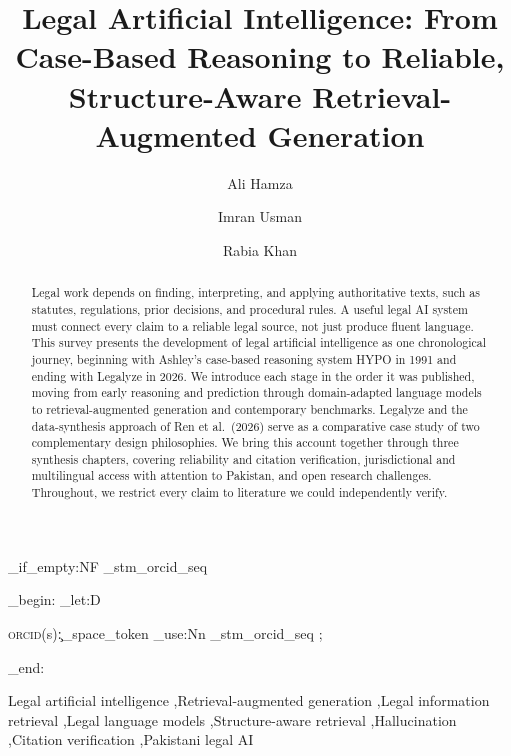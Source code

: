 \documentclass[final]{cas-dc}
\begin{document}
\ExplSyntaxOn
\RenewDocumentCommand \printorcid { }
{
  \seq_if_empty:NF \g_stm_orcid_seq
  {
    \group_begin:
      \tex_let:D \thefootnote \relax \footnotetext
      {
        \raggedright
        \textsc{orcid}(s):\c_space_token
        \seq_use:Nn \g_stm_orcid_seq { ;~ }
      }
    \group_end:
  }
}
\ExplSyntaxOff


\title[weight=\bfseries, size=\Huge]{Legal Artificial Intelligence: From Case-Based Reasoning to Reliable, Structure-Aware Retrieval-Augmented Generation}

\author{Ali Hamza}
\cormark[1]

\author{Imran Usman}

\author{Rabia Khan}



\begin{abstract}
Legal work depends on finding, interpreting, and applying authoritative texts, such as statutes,
regulations, prior decisions, and procedural rules. A useful legal AI system must connect every
claim to a reliable legal source, not just produce fluent language. This survey presents the
development of legal artificial intelligence as one chronological journey, beginning with Ashley's
case-based reasoning system HYPO in 1991 and ending with Legalyze in 2026. We introduce each stage
in the order it was published, moving from early reasoning and prediction through domain-adapted
language models to retrieval-augmented generation and contemporary benchmarks. Legalyze and the
data-synthesis approach of Ren et al.\ (2026) serve as a comparative case study of two
complementary design philosophies. We bring this account together through three synthesis
chapters, covering reliability and citation verification, jurisdictional and multilingual access
with attention to Pakistan, and open research challenges. Throughout, we restrict every claim to
literature we could independently verify.
\end{abstract}

\begin{keywords}
Legal artificial intelligence \sep Retrieval-augmented generation \sep Legal information retrieval \sep Legal language models \sep Structure-aware retrieval \sep Hallucination \sep Citation verification \sep Pakistani legal AI
\end{keywords}
\end{document}
